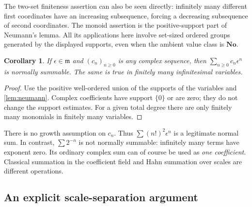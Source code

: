 \documentclass[11pt,letterpaper]{article}
\numberwithin{equation}{section}
\newtheorem{corollary}[corollary]{Corollary}
\theoremstyle{definition}
\theoremstyle{remark}
\newcommand{\No}{\mathbf{No}}
\newcommand{\mm}{\mathfrak m}
\begin{document}
The two-set finiteness assertion can also be seen directly: infinitely
many different first coordinates have an increasing subsequence, forcing
a decreasing subsequence of second coordinates. The monoid assertion is
the positive-support part of Neumann's lemma. All its applications here
involve set-sized ordered groups generated by the displayed supports,
even when the ambient value class is $\No$.

\begin{corollary}\label{cor:complexseries}
If $\epsilon\in\mm$ and $(c_n)_{n\ge0}$ is any complex sequence, then
$\sum_{n\ge0}c_n\epsilon^n$ is normally summable.
The same is true in finitely many infinitesimal variables.
\end{corollary}
\begin{proof}
Use the positive well-ordered union of the supports of the variables and
\cref{lem:neumann}. Complex coefficients have support $\{0\}$ or are zero;
they do not change the support estimates. For a given total degree there
are only finitely many monomials in finitely many variables.
\end{proof}

There is no growth assumption on $c_n$. Thus $\sum(n!)^2\epsilon^n$ is a
legitimate normal sum. In contrast, $\sum 2^{-n}$ is not normally summable:
infinitely many terms have exponent zero. Its ordinary complex sum can of
course be used as \emph{one coefficient}. Classical summation in the
coefficient field and Hahn summation over scales are different operations.

\subsection{An explicit scale-separation argument}
\end{document}
